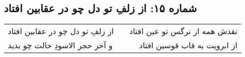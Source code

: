 \begin{center}
\section*{شماره ۱۵: از زلفِ تو دل چو در عقابین افتاد}
\label{sec:015}
\begin{longtable}{l p{0.5cm} r}
از زلفِ تو دل چو در عقابین افتاد
&&
نقدش همه از نرگس تو عین افتاد
\\
و آخر حجر الاسودِ خالت چو بدید
&&
از ابرویت به قاب قوسین افتاد
\\
\end{longtable}
\end{center}
